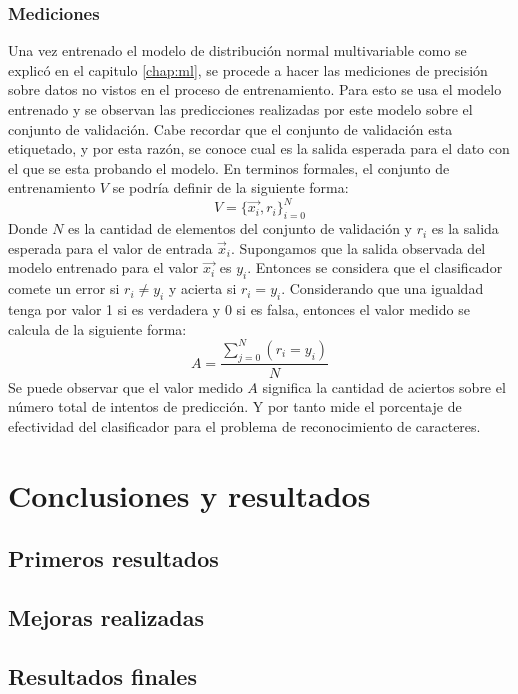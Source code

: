 \documentclass[a4paper, 11pt, oneside]{report}
\begin{document}
\subsection{Mediciones}

Una vez entrenado el modelo de distribución normal multivariable como se explicó en el capitulo \ref{chap:ml}, se procede a hacer las mediciones de precisión sobre datos no vistos en el proceso de entrenamiento. Para esto se usa el modelo entrenado y se observan las predicciones realizadas por este modelo sobre el conjunto de validación. Cabe recordar que el conjunto de validación esta etiquetado, y por esta razón, se conoce cual es la salida esperada para el dato con el que se esta probando el modelo. En terminos formales, el conjunto de entrenamiento $V$ se podría definir de la siguiente forma:
\[ V = \{\vec{x_i},r_i\}_{i=0}^N \]
Donde $N$ es la cantidad de elementos del conjunto de validación y $r_i$ es la salida esperada para el valor de entrada $\vec{x}_i$. Supongamos que la salida observada del modelo entrenado para el valor $\vec{x_i}$ es $y_i$. Entonces se considera que el clasificador comete un error si $r_i \ne y_i$ y acierta si $r_i = y_i$. Considerando que una igualdad tenga por valor 1 si es verdadera y 0 si es falsa, entonces el valor medido se calcula de la siguiente forma:
\[ A = \frac{ \sum_{j=0}^{N}(r_i=y_i) }{N} \]
Se puede observar que el valor medido $A$ significa la cantidad de aciertos sobre el número total de intentos de predicción. Y por tanto mide el porcentaje de efectividad del clasificador para el problema de reconocimiento de caracteres.

\chapter{Conclusiones y resultados}
\label{chap:results}

\section{Primeros resultados}

\section{Mejoras realizadas}

\section{Resultados finales}
\end{document}
